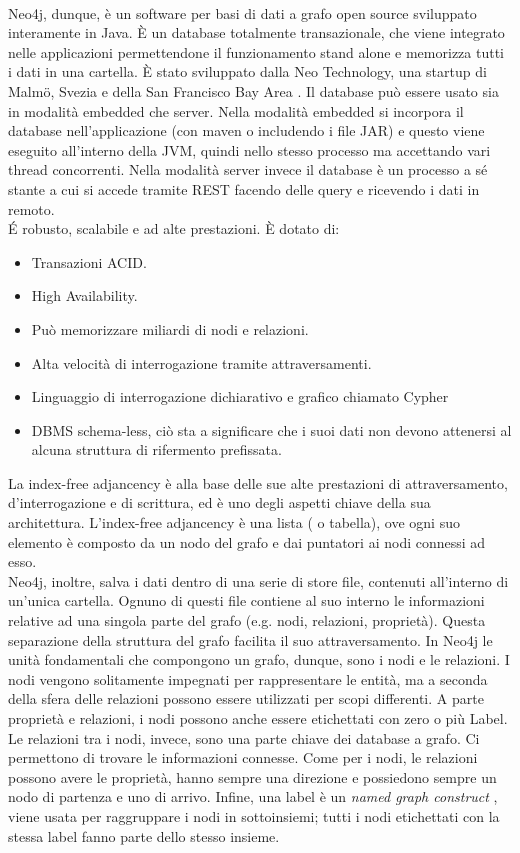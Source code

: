 \\Neo4j, dunque, è un software per basi di dati a grafo open source sviluppato interamente in Java. È un database totalmente transazionale, che viene integrato nelle applicazioni permettendone il funzionamento stand alone e memorizza tutti i dati in una cartella. È stato sviluppato dalla Neo Technology, una startup di Malmö, Svezia e della San Francisco Bay Area \cite{neo4j:wiki}. Il database può essere usato sia in modalità embedded che server. Nella modalità embedded si incorpora il database nell'applicazione (con maven o includendo i file JAR) e questo viene eseguito all'interno della JVM, quindi nello stesso processo ma accettando vari thread concorrenti. Nella modalità server invece il database è un processo a sé stante a cui si accede tramite REST facendo delle query e ricevendo i dati in remoto.
\\É robusto, scalabile e ad alte prestazioni. È dotato di:
\begin{itemize}
\item Transazioni ACID.
\item High Availability.
\item Può memorizzare miliardi di nodi e relazioni.
\item Alta velocità di interrogazione tramite attraversamenti.
\item Linguaggio di interrogazione dichiarativo e grafico chiamato Cypher
\item DBMS schema-less, ciò sta a significare che i suoi dati non devono attenersi al alcuna struttura di rifermento prefissata.
\end{itemize}
La index-free adjancency è alla base delle sue alte prestazioni di attraversamento, d'interrogazione e di scrittura, ed è uno degli aspetti chiave della sua architettura. L’index-free adjancency è una lista ( o tabella), ove ogni suo elemento è composto da un nodo del grafo e dai puntatori ai nodi connessi ad esso.
\\Neo4j, inoltre, salva i dati dentro di una serie di store file, contenuti all'interno di un'unica cartella. Ognuno di questi file contiene al suo interno le informazioni relative ad una singola parte del grafo (e.g. nodi, relazioni, proprietà). Questa separazione della struttura del grafo facilita il suo attraversamento. In Neo4j le unità fondamentali che compongono un grafo, dunque, sono i nodi e le relazioni. I nodi vengono solitamente impegnati per rappresentare le entità, ma a seconda della sfera delle relazioni possono essere utilizzati per scopi differenti. A parte proprietà e relazioni, i nodi possono anche essere etichettati con zero o più Label. Le relazioni tra i nodi, invece, sono una parte chiave dei database a grafo. Ci permettono di trovare le informazioni connesse. Come per i nodi, le relazioni possono avere le proprietà, hanno sempre una direzione e possiedono sempre un nodo di partenza e uno di arrivo. Infine, una label è un \textit{named graph construct} , viene usata per raggruppare i nodi in sottoinsiemi; tutti i nodi etichettati con la stessa label fanno parte dello stesso insieme.
